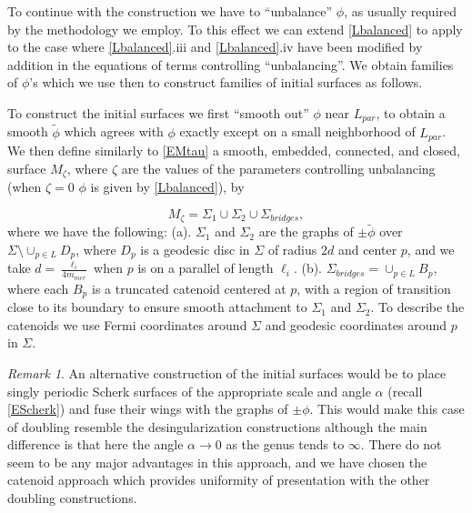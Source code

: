 \documentclass[12pt,namelimits,sumlimits]{amsart}
\theoremstyle{remark}
\newtheorem{remark}[theorem]{Remark}
\numberwithin{equation}{section}
\begin{document}
To continue with the construction we have to ``unbalance'' $\phi$,
as usually required by the methodology we employ.
To this effect we can extend \ref{Lbalanced} to apply to the case where
\ref{Lbalanced}.iii and \ref{Lbalanced}.iv
have been modified by addition in the equations of terms controlling ``unbalancing''.
We obtain families of $\phi$'s which we use then to construct families of initial surfaces as follows.

To construct the initial surfaces we first ``smooth out'' $\phi$ near ${{L_{par}}}$,
to obtain a smooth $\widetilde{\phi}$ which agrees with $\phi$ exactly
except on a small neighborhood of ${{L_{par}}}$.
We then define similarly to \ref{EMtau} 
a smooth, embedded, connected, and closed, surface $M_\zeta$,
where $\zeta$ are the values of the parameters controlling unbalancing
(when $\zeta=0$ $\phi$ is given by \ref{Lbalanced}),
by
\addtocounter{theorem}{1}
\begin{equation}
\label{EMzeta}
M_\zeta=\Sigma_1\cup\Sigma_2\cup \Sigma_{bridges},
\end{equation}
where we have the following:
\newline
(a). $\Sigma_1$ and $\Sigma_2$ are the graphs of $\pm\widetilde{\phi}$
over $\Sigma\setminus\cup_{p\in L}D_p$,
where $D_p$ is a geodesic disc in $\Sigma$ of radius $2d$ and center $p$,
and we take $d=\frac{\ell_i}{4{{m_{mer}}}}$ when $p$ is on a parallel of length $\ell_i$.
\newline
(b). $\Sigma_{bridges}=\cup_{p\in L} B_p$,
where each $B_p$ is a truncated catenoid centered at $p$,
with a region of transition close to its boundary
to ensure smooth attachment to $\Sigma_1$ and $\Sigma_2$.
To describe the catenoids we use Fermi coordinates around $\Sigma$ and geodesic
coordinates around $p$ in $\Sigma$.

\addtocounter{equation}{1}
\begin{remark}
\label{Rdoublingbyscherk}
An alternative construction of the initial surfaces would be to place
singly periodic Scherk surfaces of the appropriate scale and angle $\alpha$ (recall \ref{EScherk})
and fuse their wings with the graphs of $\pm\phi$.
This would make this case of doubling resemble the desingularization constructions although
the main difference is that here the angle $\alpha\to0$ as the genus tends to $\infty$.
There do not seem to be any major advantages in this approach,
and we have chosen the catenoid approach which provides uniformity of presentation with the other
doubling constructions.
\end{remark}
\end{document}
